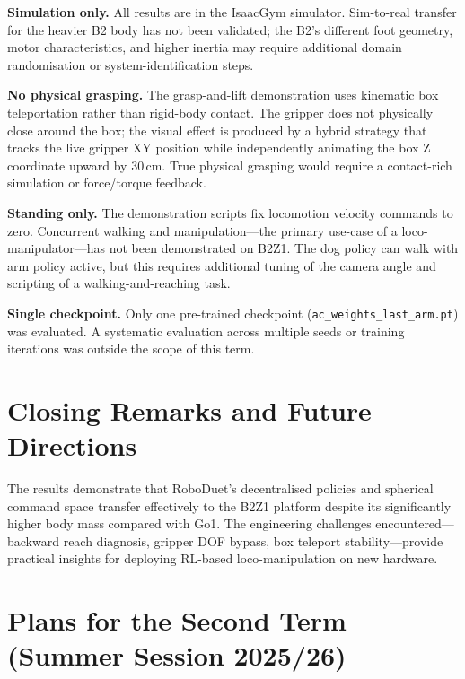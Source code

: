 \textbf{Simulation only.}  All results are in the IsaacGym simulator.
Sim-to-real transfer for the heavier B2 body has not been validated;
the B2's different foot geometry, motor characteristics, and higher inertia
may require additional domain randomisation or system-identification steps.

\textbf{No physical grasping.}  The grasp-and-lift demonstration uses
kinematic box teleportation rather than rigid-body contact.  The gripper
does not physically close around the box; the visual effect is produced by
a hybrid strategy that tracks the live gripper XY position while
independently animating the box Z coordinate upward by 30\,cm.
True physical grasping would require a contact-rich simulation or
force/torque feedback.

\textbf{Standing only.}  The demonstration scripts fix locomotion velocity
commands to zero.  Concurrent walking and manipulation---the primary
use-case of a loco-manipulator---has not been demonstrated on B2Z1.
The dog policy can walk with arm policy active, but this requires additional
tuning of the camera angle and scripting of a walking-and-reaching task.

\textbf{Single checkpoint.}  Only one pre-trained checkpoint
(\texttt{ac\_weights\_last\_arm.pt}) was evaluated.  A systematic evaluation
across multiple seeds or training iterations was outside the scope of this
term.

\section{Closing Remarks and Future Directions}

The results demonstrate that RoboDuet's decentralised policies and
spherical command space transfer effectively to the B2Z1 platform
despite its significantly higher body mass compared with Go1.
The engineering challenges encountered---backward reach diagnosis,
gripper DOF bypass, box teleport stability---provide practical insights
for deploying RL-based loco-manipulation on new hardware.

\section*{Plans for the Second Term (Summer Session 2025/26)}


